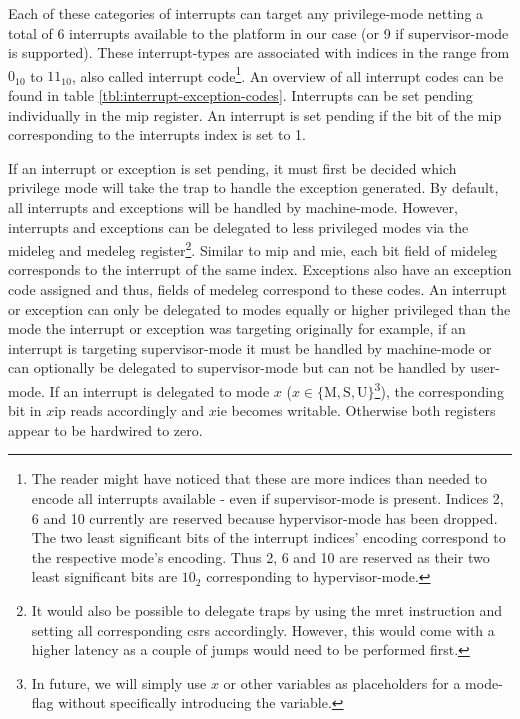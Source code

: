 Each of these categories of interrupts can target any privilege-mode netting a total of 6 interrupts available to the platform in our case (or 9 if supervisor-mode is supported).
These interrupt-types are associated with indices in the range from $ 0_{10} $ to $ 11_{10} $, also called interrupt code\footnote{%
    The reader might have noticed that these are more indices than needed to encode all interrupts available - even if supervisor-mode is present.
    Indices 2, 6 and 10 currently are reserved because hypervisor-mode has been dropped.
    The two least significant bits of the interrupt indices' encoding correspond to the respective mode's encoding.
    Thus 2, 6 and 10 are reserved as their two least significant bits are $ 10_2 $ corresponding to hypervisor-mode.
}.
An overview of all interrupt codes can be found in table \ref{tbl:interrupt-exception-codes}.
Interrupts can be set pending individually in the \gls{mip} register.
An interrupt is set pending if the bit of the \gls{mip} corresponding to the interrupts index is set to 1.

If an interrupt or exception is set pending, it must first be decided which privilege mode will take the trap to handle the exception generated.
By default, all interrupts and exceptions will be handled by machine-mode.
However, interrupts and exceptions can be delegated to less privileged modes via the \gls{mideleg} and \gls{medeleg} register\footnote{%
    It would also be possible to delegate traps by using the \gls{mret} instruction and setting all corresponding \glspl{csr} accordingly.
    However, this would come with a higher latency as a couple of jumps would need to be performed first.
}.
Similar to \gls{mip} and \gls{mie}, each bit field of \gls{mideleg} corresponds to the interrupt of the same index.
Exceptions also have an exception code assigned and thus, fields of \gls{medeleg} correspond to these codes.
An interrupt or exception can only be delegated to modes equally or higher privileged than the mode the interrupt or exception was targeting originally for example, if an interrupt is targeting supervisor-mode it must be handled by machine-mode or can optionally be delegated to supervisor-mode but can not be handled by user-mode.
If an interrupt is delegated to mode $ x $ ($ x \in \{ \text{M}, \text{S}, \text{U}\} $\footnote{%
In future, we will simply use $ x $ or other variables as placeholders for a mode-flag without specifically introducing the variable.
}), the corresponding bit in $ x\text{ip} $ reads accordingly and $ x\text{ie} $ becomes writable.
Otherwise both registers appear to be hardwired to zero.

